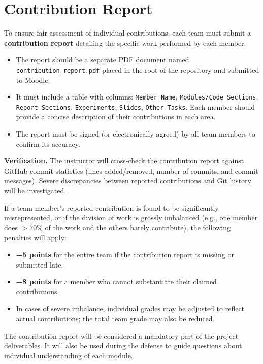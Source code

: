 \documentclass[11pt,a4paper]{article}
\newcommand{\warn}[1]{\textcolor{accent2}{\textbf{#1}}}
\begin{document}
\section{Contribution Report}\label{sec:contribution}
To ensure fair assessment of individual contributions, each team must submit a \textbf{contribution report} detailing the specific work performed by each member.
\begin{itemize}
  \item The report should be a separate PDF document named \texttt{contribution\_report.pdf} placed in the root of the repository and submitted to Moodle.
  \item It must include a table with columns: \texttt{Member Name}, \texttt{Modules/Code Sections}, \texttt{Report Sections}, \texttt{Experiments}, \texttt{Slides}, \texttt{Other Tasks}. Each member should provide a concise description of their contributions in each area.
  \item The report must be signed (or electronically agreed) by all team members to confirm its accuracy.
\end{itemize}
\textbf{Verification.} The instructor will cross-check the contribution report against GitHub commit statistics (lines added/removed, number of commits, and commit messages). Severe discrepancies between reported contributions and Git history will be investigated.
\begin{warnbox}
If a team member's reported contribution is found to be significantly misrepresented, or if the division of work is grossly imbalanced (e.g., one member does $>70\%$ of the work and the others barely contribute), the following penalties will apply:
\begin{itemize}
  \item \warn{−5 points} for the entire team if the contribution report is missing or submitted late.
  \item \warn{−8 points} for a member who cannot substantiate their claimed contributions.
  \item In cases of severe imbalance, individual grades may be adjusted to reflect actual contributions; the total team grade may also be reduced.
\end{itemize}
\end{warnbox}
The contribution report will be considered a mandatory part of the project deliverables. It will also be used during the defense to guide questions about individual understanding of each module.
\end{document}
